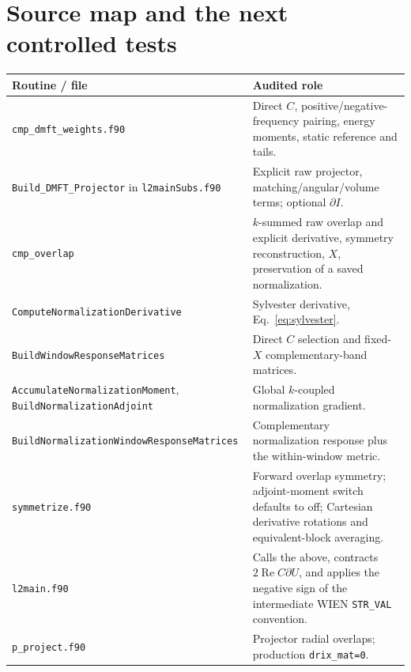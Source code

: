 \documentclass[11pt]{article}
\newcommand{\Rea}{\operatorname{Re}}
\begin{document}
\section{Source map and the next controlled tests}
\begingroup\small
\begin{longtable}{p{.46\linewidth}p{.48\linewidth}}
\toprule Routine / file & Audited role\\\midrule
\texttt{cmp\_dmft\_weights.f90} & Direct $C$, positive/negative-frequency pairing,
energy moments, static reference and tails.\\
\texttt{Build\_DMFT\_Projector} in \texttt{l2mainSubs.f90} & Explicit raw projector,
matching/angular/volume terms; optional $\partial I$.\\
\texttt{cmp\_overlap} & $k$-summed raw overlap and explicit derivative,
symmetry reconstruction, $X$, preservation of a saved normalization.\\
\texttt{ComputeNormalizationDerivative} & Sylvester derivative, Eq.~\eqref{eq:sylvester}.\\
\texttt{BuildWindowResponseMatrices} & Direct $C$ selection and fixed-$X$
complementary-band matrices.\\
\texttt{AccumulateNormalizationMoment}, \texttt{BuildNormalizationAdjoint} &
Global $k$-coupled normalization gradient.\\
\texttt{BuildNormalizationWindowResponseMatrices} & Complementary normalization
response plus the within-window metric.\\
\texttt{symmetrize.f90} & Forward overlap symmetry; adjoint-moment switch defaults
to off; Cartesian derivative rotations and equivalent-block averaging.\\
\texttt{l2main.f90} & Calls the above, contracts $2\Rea C\partial U$, and applies
the negative sign of the intermediate WIEN \texttt{STR\_VAL} convention.\\
\texttt{p\_project.f90} & Projector radial overlaps; production
\texttt{drix\_mat=0}.\\\bottomrule
\end{longtable}
\endgroup
\end{document}
